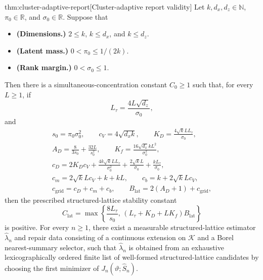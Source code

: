 \documentclass[11pt]{article}
\begin{document}
\begin{theoremv}{thm:cluster-adaptive-report}[Cluster-adaptive report validity]
Let \(k,d_x,d_z\in\mathbb N\), \(\pi_0\in\mathbb R\), and \(\sigma_0\in\mathbb R\).  Suppose that
\begin{itemize}
\item \textbf{(Dimensions.)} \(2\le k\), \(k\le d_x\), and \(k\le d_z\).
\item \textbf{(Latent mass.)} \(0<\pi_0\le 1/(2k)\).
\item \textbf{(Rank margin.)} \(0<\sigma_0\le 1\).
\end{itemize}
Then there is a simultaneous-concentration constant \(C_0\ge 1\) such that, for every \(L\ge 1\), if
\[
L_\tau=\frac{4L\sqrt{d_z}}{\sigma_0},
\]
and
\[
\begin{gathered}
s_0=\pi_0\sigma_0^2,\qquad
c_V=4\sqrt{d_xk},\qquad
K_D=\frac{4\sqrt{k}LL_\tau}{\sigma_0},\\
A_D=\frac{8}{3s_0}+\frac{32L}{s_0^2},\qquad
K_f=\frac{16\sqrt{d_x}kL^2}{\sigma_0^2},\\
c_D=2K_Dc_V+\frac{4k\sqrt{k}LL_\tau}{\sigma_0^2}
      +\frac{2\sqrt{k}L}{\sigma_0}+\frac{kL_\tau}{\sigma_0},\\
c_m=2\sqrt{k}Lc_V+k+kL,\qquad
c_b=k+2\sqrt{k}Lc_V,\\
c_{\mathrm{grid}}=c_D+c_m+c_b,\qquad
B_{\mathrm{lat}}=2(A_D+1)+c_{\mathrm{grid}},
\end{gathered}
\]
then the prescribed structured-lattice stability constant
\[
C_{\mathrm{lat}}
=
\max\left\{
\frac{8L_\tau}{s_0},
\,
(L_\tau+K_D+LK_f)B_{\mathrm{lat}}
\right\}
\]
is positive.  For every \(n\ge 1\), there exist a measurable structured-lattice estimator
\(\widehat\lambda_n\) and repair data consisting of a continuous extension on \(\mathcal K\) and a Borel nearest-summary selector, such that \(\widehat\lambda_n\) is obtained from an exhaustive lexicographically ordered finite list of well-formed structured-lattice candidates by choosing the first minimizer of \(J_n(\vartheta;\widehat S_n)\).


\end{theoremv}
\end{document}
